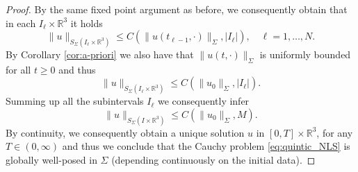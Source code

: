\documentclass[a4paper,leqno]{amsart}
\theoremstyle{plain}
\theoremstyle{definition}
\numberwithin{equation}{section}
\begin{document}
\begin{proof}
By the same fixed point argument as before, we consequently obtain that in each $I_\ell \times {{\mathbb R}}^3$ it holds
\begin{equation*}
\|u\|_{S_\Sigma(I_\ell \times {{\mathbb R}}^3)}{\leqslant} C(\|u(t_{\ell -1},\cdot) \|_{\Sigma}, |I_\ell|),\quad \ell =1, \dotsc, N.
\end{equation*}
By Corollary \ref{cor:a-priori} we also have that $\| u(t, \cdot)\|_{\Sigma}$ is uniformly bounded for all $t {\geqslant} 0$ and thus
\begin{equation*}
\|u\|_{S_\Sigma(I_\ell \times{{\mathbb R}}^3)}{\leqslant} C(\|u_0\|_{\Sigma}, |I_\ell |).
\end{equation*}
Summing up all the subintervals $I_\ell$ we consequently infer
\begin{equation*}
\|u\|_{S_\Sigma(I\times{{\mathbb R}}^3)}{\leqslant} C(\|u_0\|_{\Sigma}, M).
\end{equation*}
By continuity, we consequently obtain a unique solution $u$ in $[0,T]\times {{\mathbb R}}^3$, for any $T\in (0,\infty)$ and thus 
we conclude that the Cauchy problem \eqref{eq:quintic_NLS} is globally well-posed in $\Sigma$ (depending continuously on the initial data). 
\end{proof}
\end{document}
